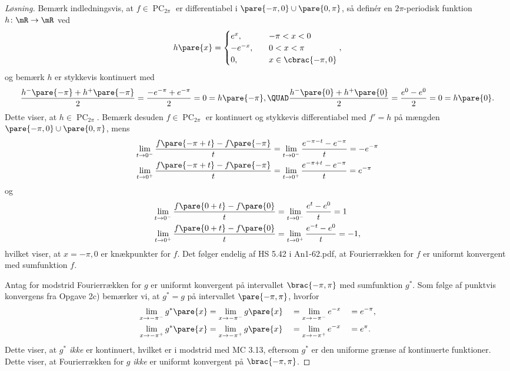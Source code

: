 \documentclass{article}
\begin{document}
\begin{opg}
\begin{enumerate}
\begin{proof}[Løsning]
Bemærk indledningsvis, at $f\in\operatorname{PC}_{2\pi}$ er differentiabel i $\pare{-\pi,0}\cup\pare{0,\pi}$, så definér en $2\pi$-periodisk funktion $h\colon \mR\to\mR$ ved
$$ h\pare{x} = \begin{cases}
    e^x, &\quad -\pi< x< 0 \\
    -e^{-x}, &\quad 0 < x < \pi \\
    0, &\quad x \in\cbrac{-\pi,0}
\end{cases}, $$
og bemærk $h$ er stykkevis kontinuert med
$$ \frac{h^-\pare{-\pi} + h^+\pare{-\pi}}{2} = \frac{-e^{-\pi} + e^{-\pi}}{2} = 0 = h\pare{-\pi}, \QUAD
    \frac{h^-\pare{0} + h^+\pare{0}}{2} = \frac{e^0 - e^0}{2} = 0
        = h\pare{0}. $$
Dette viser, at $h\in\operatorname{PC}_{2\pi}$. Bemærk desuden $f\in\operatorname{PC}_{2\pi}$ er kontinuert og stykkevis differentiabel med $f' = h$ på mængden $\pare{-\pi,0}\cup\pare{0,\pi}$, mens
\begin{align*}
    \lim_{t\to 0^-} \frac{f\pare{-\pi + t} - f\pare{-\pi}}{t}
        &= \lim_{t\to 0^-}\frac{e^{-\pi - t} - e^{-\pi}}{t} = -e^{-\pi} \\
    \lim_{t\to 0^+} \frac{f\pare{-\pi + t} - f\pare{-\pi}}{t}
        &= \lim_{t\to 0^+} \frac{e^{-\pi + t} - e^{-\pi}}{t} = e^{-\pi}
\end{align*}
og
\begin{align*}
\lim_{t\to 0^-} \frac{f\pare{0 + t} - f\pare{0}}{t}
        &= \lim_{t\to 0^-}\frac{e^{t} - e^{0}}{t} = 1 \\
    \lim_{t\to 0^+} \frac{f\pare{0 + t} - f\pare{0}}{t}
        &= \lim_{t\to 0^+} \frac{e^{-t} - e^{0}}{t} = -1,
\end{align*}
hvilket viser, at $x = -\pi,0$ er knækpunkter for $f$. Det følger endelig af HS 5.42 i An1-62.pdf, at Fourierrækken for $f$ er uniformt konvergent med sumfunktion $f$.

Antag for modstrid Fourierrækken for $g$ er uniformt konvergent på intervallet $\brac{-\pi,\pi}$ med sumfunktion $g^*$. Som følge af punktvis konvergens fra Opgave 2c) bemærker vi, at $g^* = g$ på intervallet $\pare{-\pi,\pi}$, hvorfor
\begin{alignat*}{3}
    \lim_{x\to -\pi^-} g^*\pare{x} &= \lim_{x\to -\pi^-} g\pare{x}
        &&= \lim_{x\to -\pi^-} e^{-x} &&= e^{-\pi}, \\
    \lim_{x\to -\pi^+} g^*\pare{x} &= \lim_{x\to -\pi^+} g\pare{x}
        &&= \lim_{x\to -\pi^+} e^{-x} &&= e^\pi. \\
\end{alignat*}
Dette viser, at $g^*$ \textit{ikke} er kontinuert, hvilket er i modstrid med  MC 3.13, eftersom $g^*$ er den uniforme grænse af kontinuerte funktioner. Dette viser, at Fourierrækken for $g$ \textit{ikke} er uniformt konvergent på $\brac{-\pi,\pi}$.
\end{proof}


\end{enumerate}
\end{opg}
\end{document}
